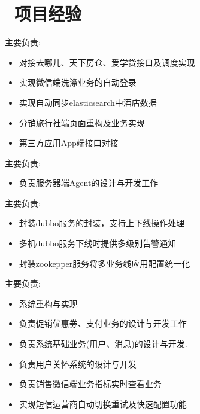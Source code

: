 \documentclass{resume}
\begin{document}
\section{\faTags\ 项目经验}
主要负责:
\begin{onehalfspacing}
\begin{itemize}
  \item 对接去哪儿、天下房仓、爱学贷接口及调度实现
  \item 实现微信端洗涤业务的自动登录
  \item 实现自动同步elasticsearch中酒店数据
  \item 分销旅行社端页面重构及业务实现
  \item 第三方应用App端接口对接
\end{itemize}
\end{onehalfspacing}
主要负责:
\begin{onehalfspacing}
\begin{itemize}
  \item 负责服务器端Agent的设计与开发工作
\end{itemize}
\end{onehalfspacing}
主要负责:
\begin{onehalfspacing}
\begin{itemize}
  \item 封装dubbo服务的封装，支持上下线操作处理
  \item 多机dubbo服务下线时提供多级别告警通知
  \item 封装zookepper服务将多业务线应用配置统一化
\end{itemize}
\end{onehalfspacing}
主要负责:
\begin{onehalfspacing}
\begin{itemize}
  \item 系统重构与实现
  \item 负责促销优惠券、支付业务的设计与开发工作
  \item 负责系统基础业务(用户、消息)的设计与开发.
  \item 负责用户关怀系统的设计与开发
  \item 负责销售微信端业务指标实时查看业务
  \item 实现短信运营商自动切换重试及快速配置功能
\end{itemize}
\end{onehalfspacing}
\end{document}
